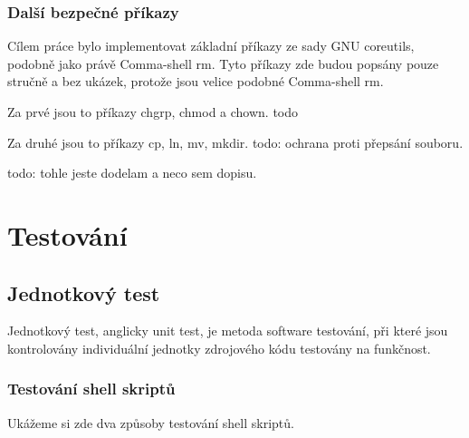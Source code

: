 \documentclass[thesis=M,czech]{FITthesis}[2012/06/26]
\begin{document}
\subsection{Další bezpečné příkazy}

Cílem práce bylo implementovat základní příkazy ze sady GNU coreutils, podobně jako právě Comma-shell rm. Tyto příkazy zde budou popsány pouze stručně a bez ukázek, protože jsou velice podobné Comma-shell rm.

Za prvé jsou to příkazy chgrp, chmod a chown. todo

Za druhé jsou to příkazy cp, ln, mv, mkdir. todo: ochrana proti přepsání souboru.

todo: tohle jeste dodelam a neco sem dopisu.




%
%
\chapter{Testování}

%
\section{Jednotkový test}

Jednotkový test, anglicky unit test, je metoda software testování, při které jsou kontrolovány individuální jednotky zdrojového kódu testovány na funkčnost.

%
\subsection{Testování shell skriptů}

Ukážeme si zde dva způsoby testování shell skriptů.
\end{document}
